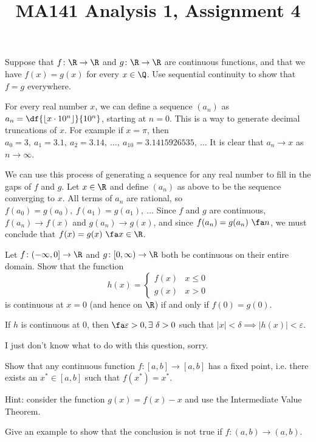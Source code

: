 \documentclass[a4paper]{article}
\title{MA141 Analysis 1, Assignment 4}
\begin{document}
\maketitle

\setlength{\parindent}{0em}
\setlength{\parskip}{1em}


\begin{questionbody}
Suppose that $f \colon \R \to \R$ and $g \colon \R \to \R$ are continuous functions, and that we have $f(x) = g(x)$ for every $x \in \Q$. Use sequential continuity to show that $f = g$ everywhere.
\end{questionbody}

For every real number $x$, we can define a sequence $(a_n)$ as $a_n = \df{\lfloor x \cdot 10^n \rfloor}{10^n}$, starting at $n=0$. This is a way to generate decimal truncations of $x$. For example if $x = \pi$, then $a_0 = 3,\ a_1 = 3.1,\ a_2 = 3.14,\ \ldots,\ a_{10} = 3.1415926535,\ \ldots$ It is clear that $a_n \to x$ as $n \to \infty$.

We can use this process of generating a sequence for any real number to fill in the gaps of $f$ and $g$. Let $x \in \R$ and define $(a_n)$ as above to be the sequence converging to $x$. All terms of $a_n$ are rational, so $f(a_0) = g(a_0),\ f(a_1) = g(a_1),\ \ldots$ Since $f$ and $g$ are continuous, $f(a_n) \to f(x)$ and $g(a_n) \to g(x)$, and since $f(a_n) = g(a_n)\ \fa n$, we must conclude that $f(x) = g(x)\ \fa x \in \R$.


\begin{questionbody}
Let $f \colon (-\infty, 0] \to \R$ and $g \colon [0, \infty) \to \R$ both be continuous on their entire domain. Show that the function \[
h(x) = \begin{cases}
	f(x) & x \le 0\\
	g(x) & x > 0
\end{cases} \]
is continuous at $x = 0$ (and hence on $\R$) if and only if $f(0) = g(0)$.
\end{questionbody}

If $h$ is continuous at 0, then $\fa \varepsilon > 0, \exists\ \delta > 0$ such that $|x| < \delta \implies |h(x)| < \varepsilon$.

I just don't know what to do with this question, sorry.


\begin{questionbody}
Show that any continuous function $f \colon [a, b] \to [a, b]$ has a fixed point, i.e. there exists an $x^* \in [a, b]$ such that $f(x^*) = x^*$.

Hint: consider the function $g(x) = f(x) - x$ and use the Intermediate Value Theorem.

Give an example to show that the conclusion is not true if $f \colon (a, b) \to (a, b)$.
\end{questionbody}
\end{document}
